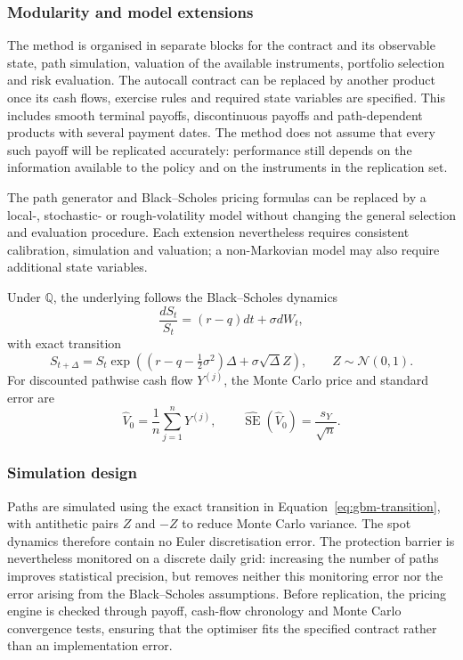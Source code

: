 \documentclass[12pt,a4paper]{article}
\newcommand{\Q}{\mathbb{Q}}
\newcommand{\1}{\mathbf{1}}
\begin{document}
\subsubsection*{Modularity and model extensions}

The method is organised in separate blocks for the contract and its observable
state, path simulation, valuation of the available instruments, portfolio
selection and risk evaluation. The autocall contract can be replaced by another
product once its cash flows, exercise rules and required state variables are
specified. This includes smooth terminal payoffs, discontinuous payoffs and
path-dependent products with several payment dates. The method does not assume
that every such payoff will be replicated accurately: performance still depends
on the information available to the policy and on the instruments in the
replication set.

The path generator and Black--Scholes pricing formulas can be replaced by a
local-, stochastic- or rough-volatility model without changing the general
selection and evaluation procedure. Each extension nevertheless requires
consistent calibration, simulation and valuation; a non-Markovian model may
also require additional state variables.

Under $\Q$, the underlying follows the Black--Scholes dynamics
\cite{blackscholes1973}
\begin{equation}
 \frac{dS_t}{S_t}=(r-q)dt+\sigma dW_t,
\label{eq:bs-dynamics}
\end{equation}
with exact transition
\begin{equation}
 S_{t+\Delta}=S_t\exp\left((r-q-\tfrac12\sigma^2)\Delta
 +\sigma\sqrt{\Delta}Z\right),\qquad Z\sim\mathcal N(0,1).
\label{eq:gbm-transition}
\end{equation}
For discounted pathwise cash flow $Y^{(j)}$, the Monte Carlo price and standard error are
\cite{glasserman2004}
\begin{equation}
 \widehat V_0=\frac1n\sum_{j=1}^nY^{(j)},\qquad
 \widehat{\operatorname{SE}}(\widehat V_0)=\frac{s_Y}{\sqrt n}.
\label{eq:mc-estimator}
\end{equation}
\subsubsection*{Simulation design}

Paths are simulated using the exact transition in
Equation~\eqref{eq:gbm-transition}, with antithetic pairs $Z$ and $-Z$ to reduce
Monte Carlo variance. The spot dynamics therefore contain no Euler
discretisation error. The protection barrier is nevertheless monitored on a
discrete daily grid: increasing the number of paths improves statistical
precision, but removes neither this monitoring error nor the error arising from
the Black--Scholes assumptions. Before replication, the pricing engine is
checked through payoff, cash-flow chronology and Monte Carlo convergence tests,
ensuring that the optimiser fits the specified contract rather than an
implementation error.
\end{document}
